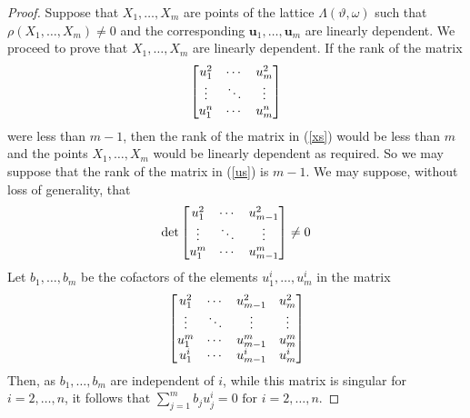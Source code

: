 \documentclass[11pt]{article}
\theoremstyle{definition}
\theoremstyle{proof}
\begin{document}
\begin{proof}
    Suppose that $X_1, \ldots, X_m$ are points of the lattice $\Lambda (\vartheta , \omega )$ such that $\rho (X_1, \ldots, X_m) \neq 0$ and the corresponding $\bm{u}_1, \ldots, \bm{u}_m$ are linearly dependent.
    We proceed to prove that $X_1, \ldots, X_m$ are linearly dependent.
    If the rank of the matrix
    \begin{align}\label{us}
        \renewcommand\arraystretch{1}
        \begin{bmatrix}
            u^2_1  & \cdots  & u^2_{m} \\
            \vdots & \ddots  & \vdots \\
            u^n_1  & \cdots  & u^n_{m}
        \end{bmatrix}
    \end{align}
    were less than $m-1$, then the rank of the matrix in (\ref{xs}) would be less than $m$ and the points $X_1, \ldots, X_m$ would be linearly dependent as required.
    So we may suppose that the rank of the matrix in (\ref{us}) is $m-1$.
    We may suppose, without loss of generality, that
    \begin{align*}
        \det %
        \renewcommand\arraystretch{1}
        \begin{bmatrix}
            u^2_1  & \cdots  & u^2_{m-1} \\
            \vdots & \ddots  & \vdots \\
            u^m_1  & \cdots  & u^m_{m-1}
        \end{bmatrix}
        \neq 0
    \end{align*}
    Let $b_1, \ldots, b_m$ be the cofactors of the elements $u^i_1, \ldots, u^i_m$ in the matrix
    \begin{align*}
        \renewcommand\arraystretch{1}
        \begin{bmatrix}
            u^2_1  & \cdots  & u^2_{m-1} & u^2_m \\
            \vdots & \ddots  & \vdots    & \vdots \\
            u^m_1  & \cdots  & u^m_{m-1} & u^m_m \\
            u^i_1  & \cdots  & u^i_{m-1} & u^i_m
        \end{bmatrix}
    \end{align*}
    Then, as $b_1, \ldots, b_m$ are independent of $i$, while this matrix is singular for $i = 2, \ldots, n$, it follows that $\displaystyle\sum_{j=1}^m b_j u^i_j = 0 \text{ for } i = 2, \ldots, n$.

\end{proof}
\end{document}
